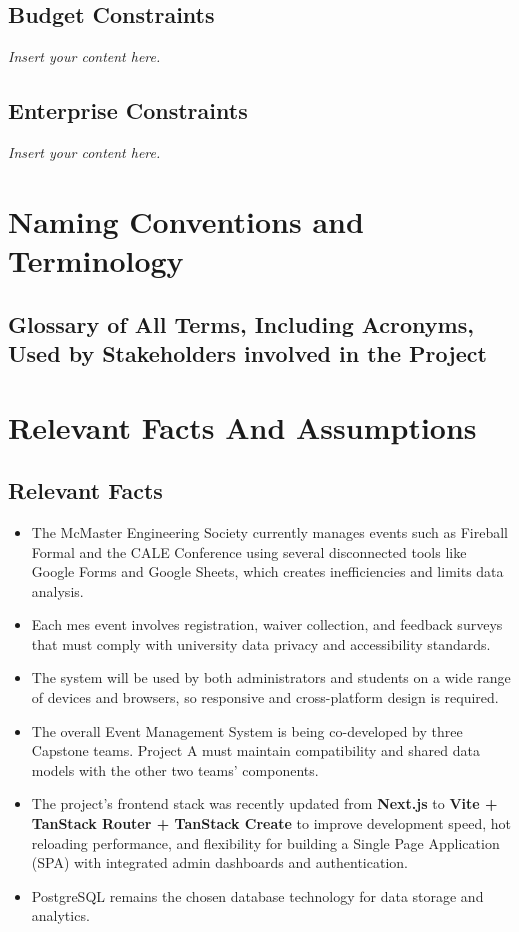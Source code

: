 \documentclass[12pt]{article}
\newcommand{\lips}{\textit{Insert your content here.}}
\begin{document}
\subsection{Budget Constraints}
\lips
\subsection{Enterprise Constraints}
\lips

\section{Naming Conventions and Terminology}
\subsection{Glossary of All Terms, Including Acronyms, Used by Stakeholders
involved in the Project}
\glsaddall
\printnoidxglossaries

\section{Relevant Facts And Assumptions}

\subsection{Relevant Facts}

\begin{itemize}
    \item The McMaster Engineering Society currently manages events such as Fireball Formal and the CALE Conference
      using several disconnected tools like Google Forms and Google Sheets, which creates inefficiencies and limits data
      analysis.
    \item Each \gls{mes} event involves registration, waiver collection, and feedback surveys that must comply with
      university data privacy and accessibility standards.
    \item The system will be used by both administrators and students on a wide range of devices and browsers, so
      responsive and cross-platform design is required.
    \item The overall Event Management System is being co-developed by three Capstone teams. Project A must maintain
      compatibility and shared data models with the other two teams’ components.
    \item The project’s frontend stack was recently updated from \textbf{Next.js} to \textbf{Vite + TanStack Router +
      TanStack Create} to improve development speed, hot reloading performance, and flexibility for building a Single
      Page Application (SPA) with integrated admin dashboards and authentication.
    \item PostgreSQL remains the chosen database technology for data storage and analytics.
\end{itemize}
\end{document}
